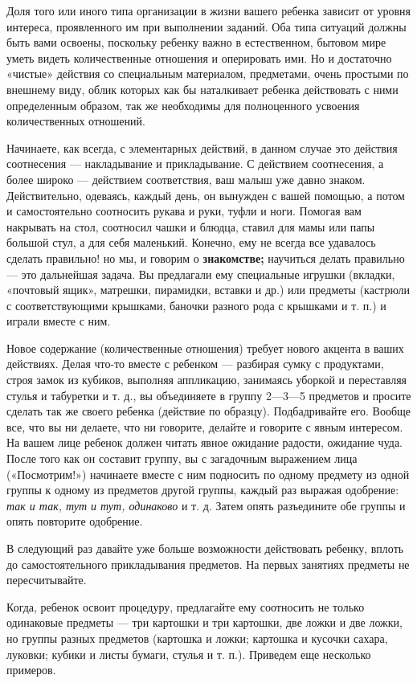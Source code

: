 \documentclass{book}
\renewcommand{\emph}[1]{\textit{#1}}
\begin{document}
Доля того или иного типа организации в жизни вашего ребенка зависит от
уровня интереса, проявленного им при выполнении заданий. Оба типа
ситуаций должны быть вами освоены, поскольку ребенку важно в
естественном, бытовом мире уметь видеть количественные отношения и
оперировать ими. Но и достаточно «чистые» действия со специальным
материалом, предметами, очень простыми по внешнему виду, облик которых
как бы наталкивает ребенка действовать с ними определенным образом, так
же необходимы для полноценного усвоения количественных отношений.

Начинаете, как всегда, с элементарных действий, в данном случае это
действия соотнесения --- накладывание и прикладывание. С действием
соотнесения, а более широко --- действием соответствия, ваш малыш уже
давно знаком. Действительно, одеваясь, каждый день, он вынужден с вашей
помощью, а потом и самостоятельно соотносить рукава и руки, туфли и
ноги. Помогая вам накрывать на стол, соотносил чашки и блюдца, ставил
для мамы или папы большой стул, а для себя маленький. Конечно, ему не
всегда все удавалось сделать правильно! но мы, и говорим о
\textbf{знакомстве;} научиться делать правильно --- это дальнейшая
задача. Вы предлагали ему специальные игрушки (вкладки, «почтовый ящик»,
матрешки, пирамидки, вставки и др.) или предметы (кастрюли с
соответствующими крышками, баночки разного рода с крышками и т. п.) и
играли вместе с ним.

Новое содержание (количественные отношения) требует нового акцента в
ваших действиях. Делая что-то вместе с ребенком --- разбирая сумку с
продуктами, строя замок из кубиков, выполняя аппликацию, занимаясь
уборкой и переставляя стулья и табуретки и т. д., вы объединяете в
группу 2---3---5 предметов и просите сделать так же своего ребенка
(действие по образцу). Подбадривайте его. Вообще все, что вы ни делаете,
что ни говорите, делайте и говорите с явным интересом. На вашем лице
ребенок должен читать явное ожидание радости, ожидание чуда. После того
как он составит группу, вы с загадочным выражением лица («Посмотрим!»)
начинаете вместе с ним подносить по одному предмету из одной группы к
одному из предметов другой группы, каждый раз выражая одобрение:
\emph{так и так, тут и тут, одинаково} и т. д. Затем опять разъедините
обе группы и опять повторите одобрение.

В следующий раз давайте уже больше возможности действовать ребенку,
вплоть до самостоятельного прикладывания предметов. На первых занятиях
предметы не пересчитывайте.

Когда, ребенок освоит процедуру, предлагайте ему соотносить не только
одинаковые предметы --- три картошки и три картошки, две ложки и две
ложки, но группы разных предметов (картошка и ложки; картошка и кусочки
сахара, луковки; кубики и листы бумаги, стулья и т. п.). Приведем еще
несколько примеров.
\end{document}
